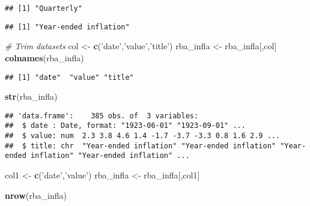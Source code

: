 \documentclass[]{article}
\newenvironment{Shaded}{\begin{snugshade}}{\end{snugshade}}
\newcommand{\KeywordTok}[1]{\textcolor[rgb]{0.13,0.29,0.53}{\textbf{#1}}}
\newcommand{\StringTok}[1]{\textcolor[rgb]{0.31,0.60,0.02}{#1}}
\newcommand{\CommentTok}[1]{\textcolor[rgb]{0.56,0.35,0.01}{\textit{#1}}}
\newcommand{\OperatorTok}[1]{\textcolor[rgb]{0.81,0.36,0.00}{\textbf{#1}}}
\newcommand{\NormalTok}[1]{#1}
\begin{document}
\begin{verbatim}
## [1] "Quarterly"
\end{verbatim}

\begin{Shaded}
\end{Shaded}

\begin{verbatim}
## [1] "Year-ended inflation"
\end{verbatim}

\begin{Shaded}
\begin{Highlighting}[]
      \CommentTok{# Trim datasets}
\NormalTok{      col <-}\StringTok{ }\KeywordTok{c}\NormalTok{(}\StringTok{'date'}\NormalTok{,}\StringTok{'value'}\NormalTok{,}\StringTok{'title'}\NormalTok{)}
\NormalTok{      rba_infla <-}\StringTok{ }\NormalTok{rba_infla[,col]}
      \KeywordTok{colnames}\NormalTok{(rba_infla)}
\end{Highlighting}
\end{Shaded}

\begin{verbatim}
## [1] "date"  "value" "title"
\end{verbatim}

\begin{Shaded}
\begin{Highlighting}[]
      \KeywordTok{str}\NormalTok{(rba_infla)}
\end{Highlighting}
\end{Shaded}

\begin{verbatim}
## 'data.frame':    385 obs. of  3 variables:
##  $ date : Date, format: "1923-06-01" "1923-09-01" ...
##  $ value: num  2.3 3.8 4.6 1.4 -1.7 -3.7 -3.3 0.8 1.6 2.9 ...
##  $ title: chr  "Year-ended inflation" "Year-ended inflation" "Year-ended inflation" "Year-ended inflation" ...
\end{verbatim}

\begin{Shaded}
\begin{Highlighting}[]
\NormalTok{      col1 <-}\StringTok{ }\KeywordTok{c}\NormalTok{(}\StringTok{'date'}\NormalTok{,}\StringTok{'value'}\NormalTok{)}
\NormalTok{      rba_infla <-}\StringTok{ }\NormalTok{rba_infla[,col1]}
      
      \KeywordTok{nrow}\NormalTok{(rba_infla)}
\end{Highlighting}
\end{Shaded}
\end{document}
